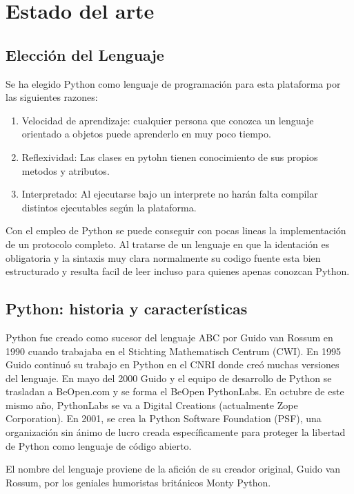 \documentclass[a4paper,spanish,12pt]{book}
\begin{document}
\chapter{Estado del arte}

\section{Elecci\'on del Lenguaje} 
Se ha elegido Python como lenguaje de programaci\'on para esta plataforma por las siguientes razones:
\begin{enumerate}
	\item Velocidad de aprendizaje: cualquier persona que conozca un lenguaje orientado a objetos puede aprenderlo en muy poco tiempo.
	\item Reflexividad: Las clases en pytohn tienen conocimiento de sus propios metodos y atributos.
	\item Interpretado: Al ejecutarse bajo un interprete no har\'an falta compilar distintos ejecutables seg\'un la plataforma.
\end{enumerate}

Con el empleo de Python se puede conseguir con pocas lineas la implementaci\'on de un protocolo completo. Al tratarse de un lenguaje en que la identaci\'on es obligatoria y la sintaxis muy clara normalmente su codigo fuente esta bien estructurado y resulta facil de leer incluso para quienes apenas conozcan Python.

\section{Python: historia y características}

Python fue creado como sucesor del lenguaje ABC por Guido van Rossum en 1990 cuando trabajaba en el Stichting Mathematisch Centrum (CWI). En 1995 Guido continuó su trabajo en Python en el CNRI donde creó muchas versiones del lenguaje. En mayo del 2000 Guido y el equipo de desarrollo de Python se trasladan a BeOpen.com y se forma el BeOpen PythonLabs. En octubre de este mismo año, PythonLabs se va a Digital Creations (actualmente Zope Corporation). En 2001, se crea la Python Software Foundation (PSF), una organización sin ánimo de lucro creada específicamente para proteger la libertad de Python como lenguaje de código abierto.

El nombre del lenguaje proviene de la afición de su creador original, Guido van Rossum, por los geniales humoristas británicos Monty Python.
\end{document}
